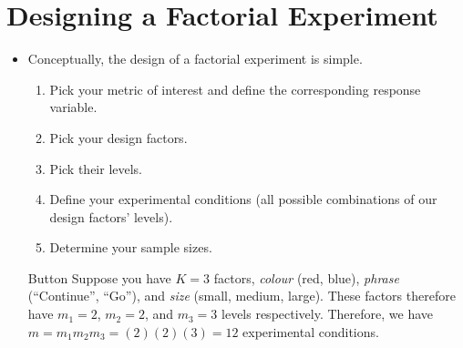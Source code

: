 \section{Designing a Factorial Experiment}
\begin{itemize}
      \item Conceptually, the design of a factorial experiment is simple.
            \begin{enumerate}[1.]
                  \item Pick your metric of interest and define the corresponding response variable.
                  \item Pick your design factors.
                  \item Pick their levels.
                  \item Define your experimental conditions (all possible combinations of our design factors' levels).
                  \item Determine your sample sizes.
            \end{enumerate}
            \begin{Example}{Button}{}
                  Suppose you have $ K=3 $ factors, \emph{colour} (red, blue), \emph{phrase} (``Continue'', ``Go''),
                  and \emph{size} (small, medium, large). These factors therefore have $ m_1=2 $, $ m_2=2 $, and $ m_3=3 $
                  levels respectively. Therefore, we have $ m=m_1m_2m_3=(2)(2)(3)=12 $ experimental conditions.
                  \begin{center}
                        \begin{tikzpicture}[x=0.75pt,y=0.75pt,yscale=-1,xscale=1]


\end{tikzpicture}
\end{center}
\end{Example}
\end{itemize}

